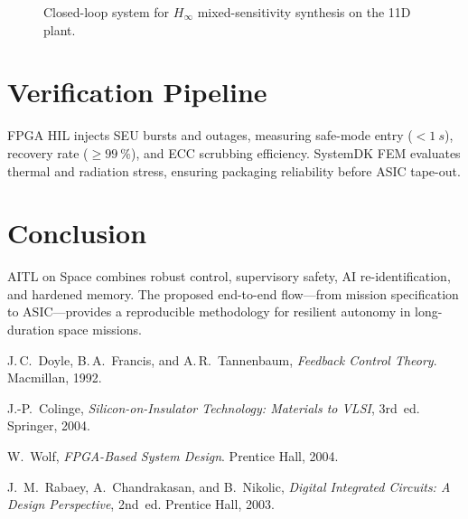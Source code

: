 \documentclass[conference]{IEEEtran}
\begin{document}
\begin{figure}[!t]
\centering
{}
\caption{Closed-loop system for $H_\infty$ mixed-sensitivity synthesis on the 11D plant.}
\label{fig:loop}
\end{figure}
\FloatBarrier

\section{Verification Pipeline}
FPGA HIL injects SEU bursts and outages, measuring safe-mode entry ($<\SI{1}{s}$), recovery rate ($\ge\SI{99}{\percent}$), and ECC scrubbing efficiency. SystemDK FEM evaluates thermal and radiation stress, ensuring packaging reliability before ASIC tape-out.

\section{Conclusion}
AITL on Space combines robust control, supervisory safety, AI re-identification, and hardened memory. The proposed end-to-end flow—from mission specification to ASIC—provides a reproducible methodology for resilient autonomy in long-duration space missions.

\begin{thebibliography}{99}
J.\,C.~Doyle, B.\,A.~Francis, and A.\,R.~Tannenbaum,
\emph{Feedback Control Theory}. Macmillan, 1992.

J.-P.~Colinge, \emph{Silicon-on-Insulator Technology: Materials to VLSI}, 3rd~ed. Springer, 2004.

W.~Wolf, \emph{FPGA-Based System Design}. Prentice Hall, 2004.

J.~M.~Rabaey, A.~Chandrakasan, and B.~Nikolic,
\emph{Digital Integrated Circuits: A Design Perspective}, 2nd~ed. Prentice Hall, 2003.
\end{thebibliography}
\end{document}
